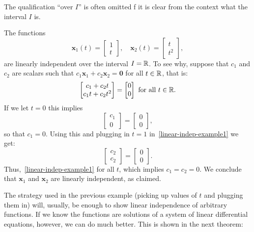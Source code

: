 The qualification ``over $I$'' is often omitted f it is clear from the context what the interval $I$ is.

\begin{example}
The functions
\[
\mathbf{x}_1(t)=\begin{bmatrix}1\\t\end{bmatrix},\quad
\mathbf{x}_2(t)=\begin{bmatrix}t\\t^2\end{bmatrix},
\]
are linearly independent over the interval $I=\mathbb{R}$. To see why, suppose that $c_1$ and $c_2$ are scalars such that $c_1\mathbf{x}_1+c_2\mathbf{x}_2=\mathbf{0}$ for all $t\in\mathbb{R}$, that is:
\begin{equation} 
\label{linear-indep-example1}
\begin{bmatrix}c_1+c_2t\\c_1t+c_2t^2\end{bmatrix}=
\begin{bmatrix}0\\0\end{bmatrix}\text{ for all $t\in\mathbb{R}$}.
\end{equation}
If we let $t=0$ this implies
\[
\begin{bmatrix}c_1\\0\end{bmatrix}=
\begin{bmatrix}0\\0\end{bmatrix},
\]
so that $c_1=0$. Using this and plugging in $t=1$ in~\eqref{linear-indep-example1} we get:
\[
\begin{bmatrix}c_2\\c_2\end{bmatrix}=
\begin{bmatrix}0\\0\end{bmatrix}.
\]
Thus,~\eqref{linear-indep-example1} for all $t$, which implies $c_1=c_2=0$. We conclude that $\mathbf{x}_1$ and $\mathbf{x}_2$ are linearly independent, as claimed.
\end{example}

The strategy used in the previous example (picking up values of $t$ and plugging them in) will, usually, be enough to show linear independence of arbitrary functions. If we know the functions are solutions of a system of linear differential equations, however, we can do much better. This is shown in the next theorem:

